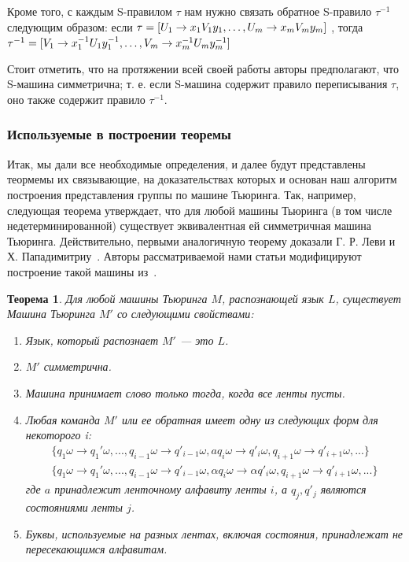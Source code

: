 \documentclass[14pt]{matmex-diploma-custom}
\newtheorem{thm}{Теорема}[subsection]
\begin{document}
Кроме того, с каждым S-правилом $ \tau $ нам нужно связать обратное 
S-правило $ \tau^{-1} $ следующим образом:
если
$\\ \tau = [U_1 \to x_1 V_1 y_1, \dots, U_m \to x_m V_m y_m]$
, тогда
$\\ \tau^{-1} = [V_1 \to x_1^{-1} U_1 y_1^{-1}, \dots, V_m \to x_m^{-1} U_m y_m^{-1}]$

Стоит отметить, что на протяжении всей своей работы авторы предполагают, что
S-машина симметрична; т. е. если S-машина содержит
правило переписывания $ \tau $, оно также содержит правило $ \tau^{-1} $.

\subsubsection{Используемые в построении теоремы}

Итак, мы дали все необходимые определения, и далее будут представлены теормемы их связывающие,
на доказательствах которых и основан наш алгоритм построения представления группы по машине Тьюринга.
Так, например, следующая теорема утверждает, что для любой машины Тьюринга (в том числе недетерминированной) существует эквивалентная ей симметричная машина Тьюринга. Действительно, 
первыми аналогичную теорему доказали Г. Р. Леви и Х. Пападимитриу~\cite{LEWIS1982161}. 
Авторы рассматриваемой нами статьи модифицируют построение такой машины из~\cite{symTM}.

\begin{thm} \label{symthm}
Для любой машины Тьюринга $M$, распознающей язык $L$, существует
Машина Тьюринга $M'$ со следующими свойствами:
\begin{enumerate}
    \item Язык, который распознает $M'$ --- это $L$.
    \item $M'$ симметрична.
    \item Машина принимает слово только тогда, когда все ленты пусты.
    \item Любая команда $M'$ или ее обратная имеет одну из следующих форм для некоторого i:
    \begin{align}
        \{q_1\omega \to q_1'\omega, ..., q_{i−1}\omega \to q′_{i−1}\omega, 
        aq_i\omega \to q′_i\omega, q_{i+1}\omega \to q′_{i+1}\omega, ...\} \label{symType1} \\
        \{q_1\omega \to q_1'\omega, ..., q_{i−1}\omega \to q′_{i−1}\omega, 
        \alpha q_i\omega \to \alpha q′_i\omega, q_{i+1}\omega \to q′_{i+1}\omega, ...\} \label{symType2}
    \end{align}
    где $a$ принадлежит ленточному алфавиту ленты $i$, а $q_j, q′_j$ являются состояниями ленты $j$.
    \item Буквы, используемые на разных лентах, включая состояния, принадлежат не пересекающимся алфавитам.
\end{enumerate}
\end{thm}
\end{document}
